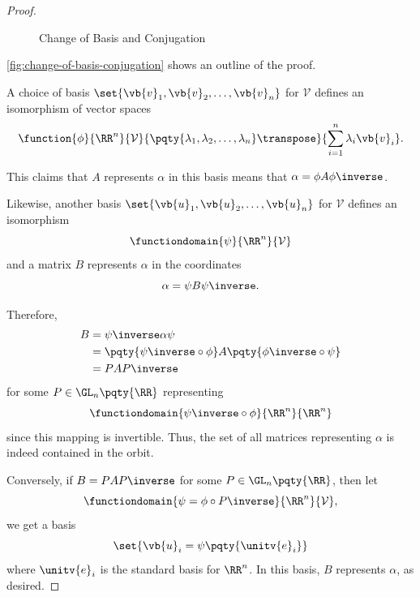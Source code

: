\begin{proof}
    \begin{figure}[ht!]
        \centering
        \caption{Change of Basis and Conjugation}
        \label{fig:change-of-basis-conjugation}
    \end{figure}

    \autoref{fig:change-of-basis-conjugation} shows an outline of the proof.

    A choice of basis \(\set{\vb{v}_1, \vb{v}_2, \ldots, \vb{v}_n}\) for \(\mathcal{V}\) defines an isomorphism of vector spaces
    \[
        \function{\phi}{\RR^n}{\mathcal{V}}{\pqty{\lambda_1, \lambda_2, \ldots, \lambda_n}\transpose}{\sum_{i = 1}^{n} \lambda_i \vb{v}_i}.
    \]

    This claims that \(A\) represents \(\alpha\) in this basis means that \(\alpha = \phi A \phi\inverse\).

    Likewise, another basis \(\set{\vb{u}_1, \vb{u}_2, \ldots, \vb{u}_n}\) for \(\mathcal{V}\) defines an isomorphism
    \[
        \functiondomain{\psi}{\RR^n}{\mathcal{V}}
    \]
    and a matrix \(B\) represents \(\alpha\) in the coordinates
    \[
        \alpha = \psi B \psi\inverse.
    \]

    Therefore,
    \begin{align*}
        B &= \psi\inverse \alpha \psi \\
        &= \pqty{\psi\inverse \circ \phi} A \pqty{\phi\inverse \circ \psi} \\
        &= P A P\inverse
    \end{align*}
    for some \(P \in \GL_n\pqty{\RR}\) representing
    \[
        \functiondomain{\psi\inverse \circ \phi}{\RR^n}{\RR^n}
    \]
    since this mapping is invertible. Thus, the set of all matrices representing \(\alpha\) is indeed contained in the orbit.

    Conversely, if \(B = P A P\inverse\) for some \(P \in \GL_n\pqty{\RR}\), then let
    \[
        \functiondomain{\psi = \phi \circ P\inverse}{\RR^n}{\mathcal{V}},
    \]
    we get a basis
    \[
        \set{\vb{u}_i = \psi\pqty{\unitv{e}_i}}
    \]
    where \(\unitv{e}_i\) is the standard basis for \(\RR^n\). In this basis, \(B\) represents \(\alpha\), as desired.
\end{proof}

